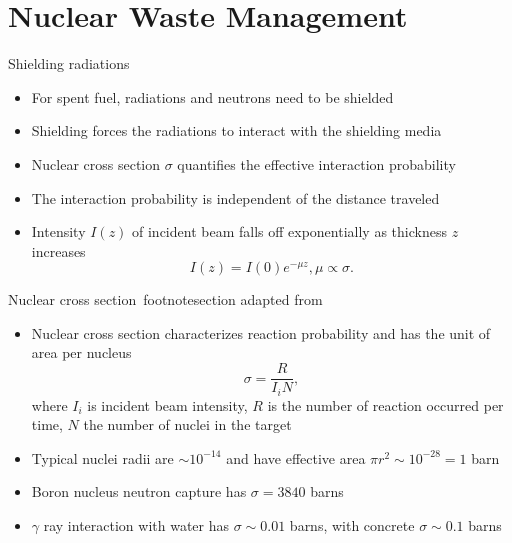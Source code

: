 \documentclass[10pt]{beamer}
\begin{document}
\section{Nuclear Waste Management}
\begin{frame}{Shielding radiations}
	\begin{itemize}[<+->]
    	\item For spent fuel, radiations and neutrons need to be shielded
    	\item Shielding forces the radiations to interact with the shielding media
        \item Nuclear cross section $\sigma$ quantifies the effective interaction probability
        \item The interaction probability is independent of the distance traveled
        \item Intensity $I(z)$ of incident beam falls off exponentially as thickness $z$ increases
        \[I(z)=I(0) e^{-\mu z}, \mu \propto \sigma.\]
    \end{itemize}
\end{frame}

\begin{frame}{Nuclear cross section\ footnote{section adapted from \cite{k88}}}
	\begin{itemize}[<+->]
	\item Nuclear cross section characterizes reaction probability and has the unit of area per nucleus
    \[\sigma = \frac{R}{I_i N},\]
    where $I_i$ is incident beam intensity, $R$ is the number of reaction occurred per time, $N$ the number of nuclei in the target
	\item Typical nuclei radii are $\sim 10^{-14}$ and have effective area $\pi r^2\sim 10^{-28}=1$ barn
    \item Boron nucleus neutron capture has $\sigma = 3840$ barns
    \item $\gamma$ ray interaction with water has $\sigma \sim 0.01$ barns, with concrete $\sigma\sim 0.1$ barns
    \end{itemize}
\end{frame}
\end{document}
